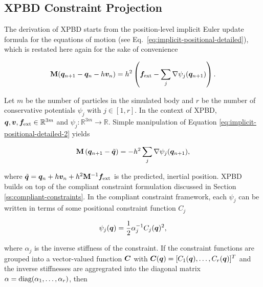 \subsection{XPBD Constraint Projection}\label{ss:xpbd-constraint-projection}
The derivation of XPBD \cite{macklin2016} starts from the position-level implicit Euler update formula for the equations of motion 
(see Eq.\ \ref{eq:implicit-positional-detailed}), which is restated here again for the sake of convenience

\begin{equation}\label{eq:implicit-positional-detailed-2}
    \mathbf{M}(\bm{q}_{n+1} - \bm{q}_n - h\bm{v}_n) = h^2\left(\bm{f_\text{ext}} - \sum_j \nabla \psi_j(\bm{q}_{n+1})\right).
\end{equation}

\noindent Let $m$ be the number of particles in the simulated body and $r$ be the number of conservative potentials $\psi_j$ with $j \in [1, r]$.
In the context of XPBD, $\bm{q}, \bm{v}, \bm{f}_{\text{ext}} \in \mathbb{R}^{3m}$ and $\psi_j \colon \mathbb{R}^{3m} \to \mathbb{R}$. Simple 
manipulation of Equation \ref{eq:implicit-positional-detailed-2} yields

\begin{equation}\label{eq:implicit-positional-detailed-3}
    \mathbf{M} \left( \bm{q}_{n+1} - \tilde{\bm{q}} \right) = - h^2 \sum_j \nabla \psi_j(\bm{q}_{n+1}),
\end{equation}

\noindent where $\tilde{\bm{q}} = \bm{q}_n + h\bm{v}_n + h^2 \mathbf{M}^{-1} \bm{f}_{\text{ext}}$ is the predicted, inertial position. XPBD builds on
top of the compliant constraint formulation discussed in Section \ref{ss:compliant-constraints}. In the compliant constraint framework, each $\psi_j$ 
can be written in terms of some positional constraint function $C_j$ 

\begin{equation}\label{eq:xpbd-potential-j}
    \psi_j(\bm{q}) = \frac{1}{2} \alpha^{-1}_j C_j(\bm{q})^2,
\end{equation}

\noindent where $\alpha_j$ is the inverse stiffness of the constraint. If the constraint functions are grouped into a vector-valued function
$\bm{C}$ with $\bm{C}(\bm{q}) = [C_1(\bm{q}), \ldots, C_r(\bm{q})]^T$ and the inverse stiffnesses are aggregrated into the diagonal matrix
$\mathbf{\alpha} = \text{diag}(\alpha_1, \ldots, \alpha_r)$, then

